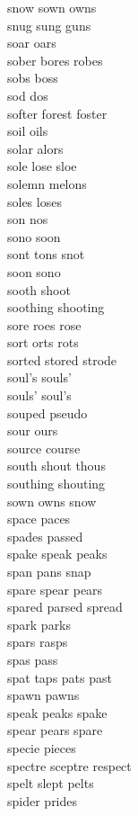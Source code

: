 snow sown owns\\
snug sung guns\\
soar oars\\
sober bores robes\\
sobs boss\\
sod dos\\
softer forest foster\\
soil oils\\
solar alors\\
sole lose sloe\\
solemn melons\\
soles loses\\
son nos\\
sono soon\\
sont tons snot\\
soon sono\\
sooth shoot\\
soothing shooting\\
sore roes rose\\
sort orts rots\\
sorted stored strode\\
soul's souls'\\
souls' soul's\\
souped pseudo\\
sour ours\\
source course\\
south shout thous\\
southing shouting\\
sown owns snow\\
space paces\\
spades passed\\
spake speak peaks\\
span pans snap\\
spare spear pears\\
spared parsed spread\\
spark parks\\
spars rasps\\
spas pass\\
spat taps pats past\\
spawn pawns\\
speak peaks spake\\
spear pears spare\\
specie pieces\\
spectre sceptre respect\\
spelt slept pelts\\
spider prides\\
